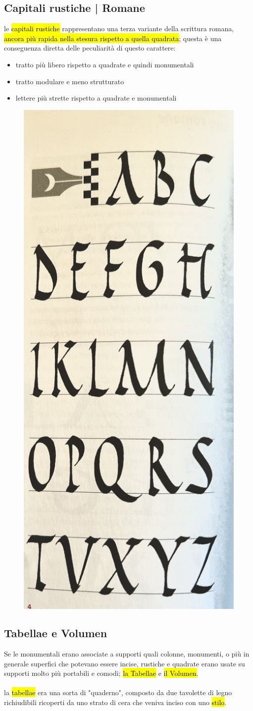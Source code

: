 \subsection{Capitali rustiche | Romane}
le \hl{capitali rustiche} rappresentano una terza variante della scrittura romana, \hl{ancora più rapida nella stesura rispetto a quella quadrata}; questa è una conseguenza diretta delle peculiarità di questo carattere:
\begin{itemize}
    \item tratto più libero rispetto a quadrate e quindi monumentali
    \item tratto modulare e meno strutturato
    \item lettere più strette rispetto a quadrate e monumentali
\end{itemize}
\begin{figure}[H]
    \centering
    \includegraphics[width=0.2\linewidth]{lezione_3/imgs/cap_rustica.jpg}
\end{figure}

\subsection{Tabellae e Volumen}
Se le monumentali erano associate a supporti quali colonne, monumenti, o più in generale superfici che potevano essere incise, rustiche e quadrate erano usate su supporti molto più portabili e comodi; \hl{la Tabellae} e \hl{il Volumen}.
\\\\
la \hl{tabellae} era una sorta di "quaderno", composto da due tavolette di legno richiudibili ricoperti da uno strato di cera che veniva inciso con uno \hl{stilo}.

